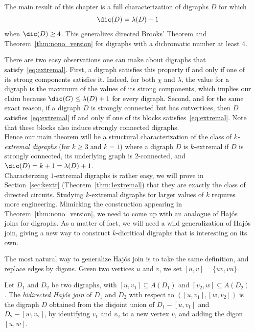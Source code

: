 The main result of this chapter is  a full characterization of digraphs $D$ for which 
\begin{equation}\label{eq:extremal}
\dic(D) = \lambda(D) + 1    
\end{equation}
 when $\dic(D) \geq 4$. This generalizes directed Brooks' Theorem and Theorem~\ref{thm:nono_version} for digraphs with a dichromatic number at least $4$. 
\medskip 

There are two easy observations one can make about digraphs that satisfy~\ref{eq:extremal}. First, a digraph satisfies this property if and only if one of its strong components satisfies it. Indeed, for both $\chi$ and $\lambda$, the value for a digraph is the maximum of the values of its strong components, which implies our claim because $\dic(G)\leq \lambda(D)+1$ for every digraph. Second, and for the same exact reason, if a digraph $D$ is strongly connected but has cutvertices, then $D$ satisfies~\ref{eq:extremal} if and only if one of its blocks satisfies~\ref{eq:extremal}. Note that these blocks also induce strongly connected digraphs.\\

Hence our main theorem will be a structural characterization of the class of \emph{$k$-extremal digraphs} (for $k\geq 3$ and $k=1$) where a digraph $D$ is $k$-extremal if $D$ is strongly connected, its underlying graph is $2$-connected, and $\dic(D) = k+1 = \lambda(D) + 1 $.\\

Characterizing $1$-extremal digraphs is rather easy, we will prove in Section~\ref{sec:kextr} (Theorem~\ref{thm:1extremal}) that they are exactly the class of directed circuits. Studying $k$-extremal digraphs for larger values of $k$ requires more engineering. Mimicking the construction appearing in Theorem~\ref{thm:nono_version}, we need to come up with an analogue of Haj\'os joins for digraphs. 
As a matter of fact, we will need a wild generalization of Haj\'os join, giving a new way to construct $k$-dicritical  digraphs that is interesting on its own. 


The most natural way to generalize Haj\'os join is to take the same definition, and replace edges by digons. Given two vertices $u$ and $v$, we set $[u,v] = \{uv, vu\}$. 



\begin{definition}\label{def:bidirected_HJ}
  Let $D_1$ and $D_2$ be two digraphs, with $[u,v_1] \subseteq A(D_1)$ and  $[v_2,w] \subseteq A(D_2)$. 
The \emph{bidirected Haj\'os join} of $D_1$ and $D_2$ with respect to $([u,v_1], [w, v_2])$ is the digraph $D$ obtained from the disjoint union of $D_1- [u,v_1]$ and $D_2 - [w, v_2]$, by identifying $v_1$ and $v_2$ to a new vertex $v$, and adding the digon $[u,w]$.   
\end{definition}

